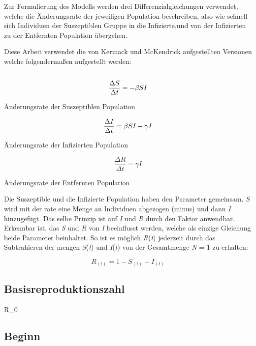 \documentclass[12pt]{scrartcl} %
\begin{document}
Zur Formulierung des Modells werden drei Differenzialgleichungen verwendet, welche die Änderungsrate der jeweiligen Population beschreiben, also wie schnell sich Individuen der Suszeptiblen Gruppe in die Infizierte,und von der Infizierten zu der Entfernten Population übergehen.

Diese Arbeit verwendet die von Kermack und McKendrick aufgestellten Versionen welche folgendermaßen aufgestellt werden:\cite[s.10]{3}

$$  $$

$$ \frac{\Delta S}{\Delta t} = -\beta\space S I $$
\begin{center}
Änderungsrate der Suszeptiblen Population
\end{center}
$$ \frac{\Delta I}{\Delta t} = \beta\space S I - \gamma I $$
\begin{center}
Änderungsrate der Infizierten Population
\end{center}
$$ \frac{\Delta R}{\Delta t} = \gamma I $$
\begin{center}
Änderungsrate der Entfernten Population \cite{7}
\end{center}

Die Suszeptible und die Infizierte Population haben den Parameter \textbeta \space gemeinsam. \textit{S} wird mit der rate \textbeta \space eine Menge an Individuen abgezogen (minus) und dann \textit{I} hinzugefügt. Das selbe Prinzip ist auf \textit{I} und \textit{R} durch den Faktor \textgamma \space anwendbar.\cite{3, 4}
Erkennbar ist, das \textit{S} und \textit{R} von \textit{I} beeinflusst werden, welche als einzige Gleichung beide Parameter beinhaltet. So ist es möglich \textit{R}(\textit{t}) jederzeit durch das Subtrahieren der mengen \textit{S}(\textit{t}) und \textit{I}(\textit{t}) von der Gesamtmenge \textit{N} = 1 zu erhalten: \cite[vgl. s. 128]{5}

$$ R_{(t)} = 1 - S_{(t)} - I_{(t)} $$



\subsection{Basisreproduktionszahl}

R_{0}


\newpage
\subsection{Beginn}
\end{document}
